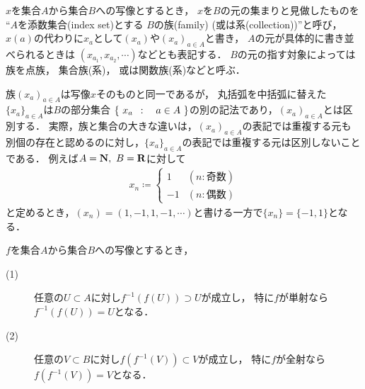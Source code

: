 	\begin{screen}
		\begin{dfn}[族・系]\label{dfn:family_collection}
			$x$を集合$A$から集合$B$への写像とするとき，
			$x$を$B$の元の集まりと見做したものを
			``$A$を添数集合(index set)とする
			$B$の族(family) (或は系(collection))''と呼び，
			$x(a)$の代わりに$x_a$として$(x_a)$や$(x_a)_{a \in A}$と書き，
			$A$の元が具体的に書き並べられるときは
			$(x_{a_1},x_{a_2},\cdots)$などとも表記する．
			$B$の元の指す対象によっては
			族を点族，
			集合族(系)，
			或は関数族(系)などと呼ぶ．
		\end{dfn}
	\end{screen}
	族$(x_a)_{a \in A}$は写像$x$そのものと同一であるが，
	丸括弧を中括弧に替えた$\{x_a\}_{a \in A}$は$B$の部分集合
	$\left\{\ x_a\ \, : \quad a \in A\ \right\}$の別の記法であり，$(x_a)_{a \in A}$とは区別する．
	実際，族と集合の大きな違いは，$(x_a)_{a \in A}$の表記では重複する元も
	別個の存在と認めるのに対し，$\{x_a\}_{a \in A}$の表記では重複する元は区別しないことである．
	例えば$A = \mathbf{N},\ B = \mathbf{R}$に対して
	\begin{align}
		x_n \coloneqq
		\begin{cases}
			1 & (n:\mbox{奇数}) \\
			-1 & (n:\mbox{偶数})
		\end{cases}
	\end{align}
	と定めるとき，$(x_n) = (1,-1,1,-1,\cdots)$と書ける一方で$\{x_n\} = \{-1,1\}$となる．
	
	\begin{screen}
		\begin{thm}[全射・単射・像・原像]\label{projective_injective_image_preimage}
			$f$を集合$A$から集合$B$への写像とするとき，
			\begin{description}
				\item[(1)] 任意の$U \subset A$に対し$f^{-1}\left(f(U)\right) \supset U$が成立し，
					特に$f$が単射なら$f^{-1}\left(f(U)\right) = U$となる．
				\item[(2)] 任意の$V \subset B$に対し$f\left(f^{-1}(V)\right) \subset V$が成立し，
					特に$f$が全射なら$f\left(f^{-1}(V)\right) = V$となる．
			\end{description}
		\end{thm}
	\end{screen}
	
